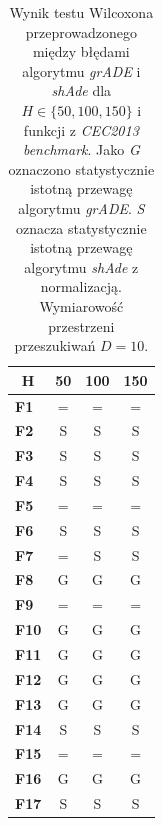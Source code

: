 \documentclass[12pt,a4paper]{report}
\begin{document}
{{{{{{{%
\begin{table}[]
\centering
\caption{Wynik testu Wilcoxona przeprowadzonego między błędami algorytmu \emph{grADE} i \emph{shAde} dla $H \in \{50, 100, 150\}$ i funkcji z \emph{CEC2013 benchmark}. Jako \emph{G} oznaczono statystycznie istotną przewagę algorytmu \emph{grADE}. \emph{S} oznacza statystycznie istotną przewagę algorytmu \emph{shAde} z normalizacją. Wymiarowość przestrzeni przeszukiwań $D = 10$.}
\label{Anal21}
\begin{tabular}{|l|c|c|c|}
\hline
\multicolumn{1}{|c|}{{\bf H}} & {\bf 50} & {\bf 100} & {\bf 150} \\ \hline
{\bf F1}                      & =        & =         & =         \\ \hline
{\bf F2}                      & S        & S         & S         \\ \hline
{\bf F3}                      & S        & S         & S         \\ \hline
{\bf F4}                      & S        & S         & S         \\ \hline
{\bf F5}                      & =        & =         & =         \\ \hline
{\bf F6}                      & S        & S         & S         \\ \hline
{\bf F7}                      & =        & S         & S         \\ \hline
{\bf F8}                      & G        & G         & G         \\ \hline
{\bf F9}                      & =        & =         & =         \\ \hline
{\bf F10}                     & G        & G         & G         \\ \hline
{\bf F11}                     & G        & G         & G         \\ \hline
{\bf F12}                     & G        & G         & G         \\ \hline
{\bf F13}                     & G        & G         & G         \\ \hline
{\bf F14}                     & S        & S         & S         \\ \hline
{\bf F15}                     & =        & =         & =         \\ \hline
{\bf F16}                     & G        & G         & G         \\ \hline
{\bf F17}                     & S        & S         & S         \\ \hline

\end{tabular}
\end{table}}}}}}}}
\end{document}
